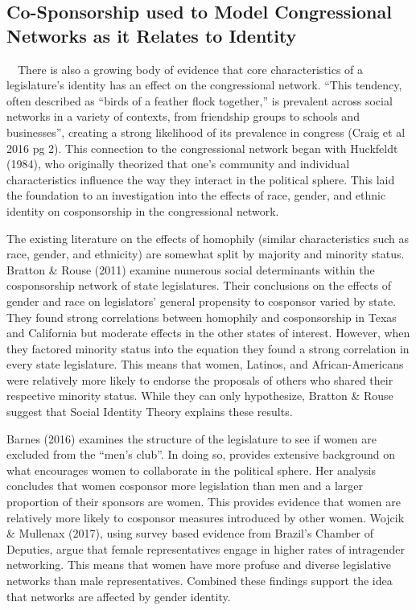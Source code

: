 \documentclass[Royal,times,sageh]{sagej}
\begin{document}
\hypertarget{co-sponsorship-used-to-model-congressional-networks-as-it-relates-to-identity}{%
\subsection{Co-Sponsorship used to Model Congressional Networks as it
Relates to
Identity}\label{co-sponsorship-used-to-model-congressional-networks-as-it-relates-to-identity}}

~~There is also a growing body of evidence that core characteristics of
a legislature's identity has an effect on the congressional network.
``This tendency, often described as ``birds of a feather flock
together,'' is prevalent across social networks in a variety of
contexts, from friendship groups to schools and businesses'', creating a
strong likelihood of its prevalence in congress (Craig et al 2016 pg 2).
This connection to the congressional network began with Huckfeldt
(1984), who originally theorized that one's community and individual
characteristics influence the way they interact in the political sphere.
This laid the foundation to an investigation into the effects of race,
gender, and ethnic identity on cosponsorship in the congressional
network.

The existing literature on the effects of homophily (similar
characteristics such as race, gender, and ethnicity) are somewhat split
by majority and minority status. Bratton \& Rouse (2011) examine
numerous social determinants within the cosponsorship network of state
legislatures. Their conclusions on the effects of gender and race on
legislators' general propensity to cosponsor varied by state. They found
strong correlations between homophily and cosponsorship in Texas and
California but moderate effects in the other states of interest.
However, when they factored minority status into the equation they found
a strong correlation in every state legislature. This means that women,
Latinos, and African-Americans were relatively more likely to endorse
the proposals of others who shared their respective minority status.
While they can only hypothesize, Bratton \& Rouse suggest that Social
Identity Theory explains these results.

Barnes (2016) examines the structure of the legislature to see if women
are excluded from the ``men's club''. In doing so, provides extensive
background on what encourages women to collaborate in the political
sphere. Her analysis concludes that women cosponsor more legislation
than men and a larger proportion of their sponsors are women. This
provides evidence that women are relatively more likely to cosponsor
measures introduced by other women. Wojcik \& Mullenax (2017), using
survey based evidence from Brazil's Chamber of Deputies, argue that
female representatives engage in higher rates of intragender networking.
This means that women have more profuse and diverse legislative networks
than male representatives. Combined these findings support the idea that
networks are affected by gender identity.
\end{document}
